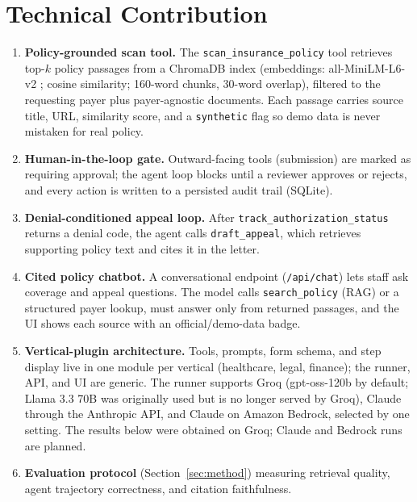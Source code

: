\documentclass[final]{cvpr}
\begin{document}
\section{Technical Contribution}
\begin{enumerate}
\item \textbf{Policy-grounded scan tool.} The \texttt{scan\_insurance\_policy} tool retrieves top-$k$ policy passages from a ChromaDB index (embeddings: all-MiniLM-L6-v2 \cite{reimers2019sbert}; cosine similarity; 160-word chunks, 30-word overlap), filtered to the requesting payer plus payer-agnostic documents. Each passage carries source title, URL, similarity score, and a \texttt{synthetic} flag so demo data is never mistaken for real policy.
\item \textbf{Human-in-the-loop gate.} Outward-facing tools (submission) are marked as requiring approval; the agent loop blocks until a reviewer approves or rejects, and every action is written to a persisted audit trail (SQLite).
\item \textbf{Denial-conditioned appeal loop.} After \texttt{track\_authorization\_status} returns a denial code, the agent calls \texttt{draft\_appeal}, which retrieves supporting policy text and cites it in the letter.
\item \textbf{Cited policy chatbot.} A conversational endpoint (\texttt{/api/chat}) lets staff ask coverage and appeal questions. The model calls \texttt{search\_policy} (RAG) or a structured payer lookup, must answer only from returned passages, and the UI shows each source with an official/demo-data badge.
\item \textbf{Vertical-plugin architecture.} Tools, prompts, form schema, and step display live in one module per vertical (healthcare, legal, finance); the runner, API, and UI are generic. The runner supports Groq (gpt-oss-120b by default; Llama 3.3 70B was originally used but is no longer served by Groq), Claude through the Anthropic API, and Claude on Amazon Bedrock, selected by one setting. The results below were obtained on Groq; Claude and Bedrock runs are planned.
\item \textbf{Evaluation protocol} (Section~\ref{sec:method}) measuring retrieval quality, agent trajectory correctness, and citation faithfulness.
\end{enumerate}
\end{document}
